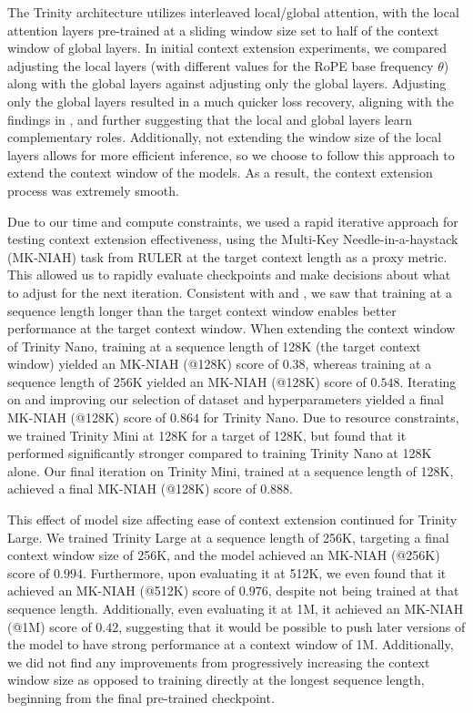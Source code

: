 \documentclass{article}
\begin{document}
The Trinity architecture utilizes interleaved local/global attention, with the local attention layers pre-trained at a sliding window size set to half of the context window of global layers. In initial context extension experiments, we compared adjusting the local layers (with different values for the RoPE base frequency $\theta$) along with the global layers against adjusting only the global layers. Adjusting only the global layers resulted in a much quicker loss recovery, aligning with the findings in \cite{yang2025ropenopeagainnew}, and further suggesting that the local and global layers learn complementary roles. Additionally, not extending the window size of the local layers allows for more efficient inference, so we choose to follow this approach to extend the context window of the models. As a result, the context extension process was extremely smooth.

Due to our time and compute constraints, we used a rapid iterative approach for testing context extension effectiveness, using the Multi-Key Needle-in-a-haystack (MK-NIAH) task from RULER \citep{hsieh2024rulerwhatsrealcontext} at the target context length as a proxy metric. This allowed us to rapidly evaluate checkpoints and make decisions about what to adjust for the next iteration. Consistent with \cite{gao2025trainlongcontextlanguagemodels} and \cite{nvidia2025nvidianemotronnano2}, we saw that training at a sequence length longer than the target context window enables better performance at the target context window. When extending the context window of Trinity Nano, training at a sequence length of 128K (the target context window) yielded an MK-NIAH (@128K) score of $0.38$, whereas training at a sequence length of 256K yielded an MK-NIAH (@128K) score of $0.548$. Iterating on and improving our selection of dataset and hyperparameters yielded a final MK-NIAH (@128K) score of $0.864$ for Trinity Nano. Due to resource constraints, we trained Trinity Mini at 128K for a target of 128K, but found that it performed significantly stronger compared to training Trinity Nano at 128K alone. Our final iteration on Trinity Mini, trained at a sequence length of 128K, achieved a final MK-NIAH (@128K) score of $0.888$.

This effect of model size affecting ease of context extension continued for Trinity Large. We trained Trinity Large at a sequence length of 256K, targeting a final context window size of 256K, and the model achieved an MK-NIAH (@256K) score of $0.994$. Furthermore, upon evaluating it at 512K, we even found that it achieved an MK-NIAH (@512K) score of $0.976$, despite not being trained at that sequence length. Additionally, even evaluating it at 1M, it achieved an MK-NIAH (@1M) score of $0.42$, suggesting that it would be possible to push later versions of the model to have strong performance at a context window of 1M. Additionally, we did not find any improvements from progressively increasing the context window size as opposed to training directly at the longest sequence length, beginning from the final pre-trained checkpoint.
\end{document}
